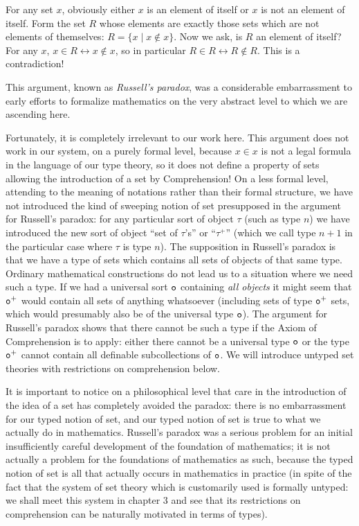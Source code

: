 \documentclass[12pt]{book}
\begin{document}
For any set $x$, obviously either $x$ is an element of itself or $x$
is not an element of itself.  Form the set $R$ whose elements are
exactly those sets which are not elements of themselves: $R = \{x \mid
x \not\in x\}$.  Now we ask, is $R$ an element of itself?  For any $x$,
$x \in R \leftrightarrow x \not\in x$, so in particular $R \in R \leftrightarrow R
\not\in R$.  This is a contradiction!

This argument, known as {\em Russell's paradox\/}, was a considerable
embarrassment to early efforts to formalize mathematics on the very
abstract level to which we are ascending here.  

Fortunately, it is completely irrelevant to our work here.  This
argument does not work in our system, on a purely formal level,
because $x \in x$ is not a legal formula in the language of our type
theory, so it does not define a property of sets allowing the
introduction of a set by Comprehension!  On a less formal level,
attending to the meaning of notations rather than their formal
structure, we have not introduced the kind of sweeping notion of set
presupposed in the argument for Russell's paradox: for any particular
sort of object $\tau$ (such as type $n$) we have introduced the new
sort of object ``set of $\tau$'s'' or ``$\tau^+$'' (which
we call type $n+1$ in the particular case where $\tau$ is type $n$).
The supposition in Russell's paradox is that we have a type of sets
which contains all sets of objects of that same type.  Ordinary
mathematical constructions do not lead us to a situation where we need
such a type.  If we had a universal sort ${\tt o}$ containing {\em all
objects\/} it might seem that ${\tt o}^+$ would contain all sets of
anything whatsoever (including sets of type ${\tt o}^+$ sets, which
would presumably also be of the universal type ${\tt o}$).  The
argument for Russell's paradox shows that there cannot be such a type
if the Axiom of Comprehension is to apply: either there cannot be a
universal type ${\tt o}$ or the type ${\tt o}^+$ cannot contain all
definable subcollections of ${\tt o}$.  We will introduce untyped set
theories with restrictions on comprehension below.

It is important to notice on a philosophical level that care in the
introduction of the idea of a set has completely avoided the paradox:
there is no embarrassment for our typed notion of set, and our typed
notion of set is true to what we actually do in mathematics.
Russell's paradox was a serious problem for an initial insufficiently
careful development of the foundation of mathematics; it is not
actually a problem for the foundations of mathematics as such, because
the typed notion of set is all that actually occurs in mathematics in
practice (in spite of the fact that the system of set theory which is
customarily used is formally untyped: we shall meet this system in
chapter 3 and see that its restrictions on comprehension can be
naturally motivated in terms of types).
\end{document}
